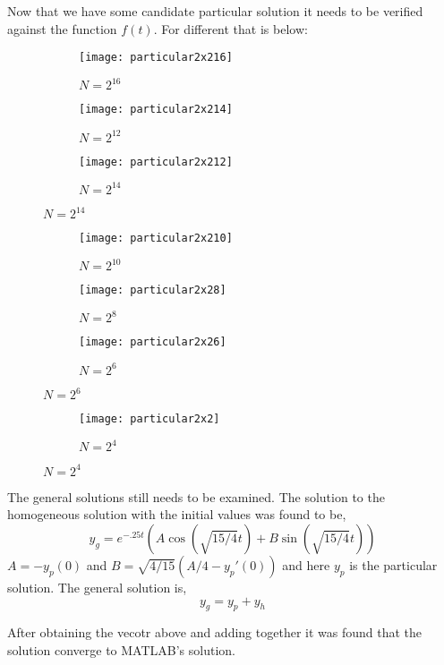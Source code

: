 \documentclass[]{article}
\begin{document}
\begin{flushleft}
Now that we have some candidate particular solution it needs to be verified against the function $ f(t) $. For different that is below:

\begin{figure}[H]
	\centering
	\begin{subfigure}[b]{0.3\textwidth}
		\texttt{[image: particular2x216]}
		\caption{$ N= 2^{16} $}
	\end{subfigure}
	\begin{subfigure}[b]{0.3\textwidth}
		\texttt{[image: particular2x214]}
		\caption{$ N= 2^{12} $}
	\end{subfigure}
	\begin{subfigure}[b]{0.3\textwidth}
		\texttt{[image: particular2x212]}
		\caption{$ N= 2^{14} $}
	\end{subfigure}
\end{figure}


\begin{figure}[H]
	\centering
		\begin{subfigure}[b]{0.3\textwidth}
			\texttt{[image: particular2x210]}
			\caption{$ N= 2^{10} $}
		\end{subfigure}
	\begin{subfigure}[b]{0.3\textwidth}
		\texttt{[image: particular2x28]}
		\caption{$ N= 2^{8} $}
	\end{subfigure}
	\begin{subfigure}[b]{0.3\textwidth}
		\texttt{[image: particular2x26]}
		\caption{$ N= 2^{6} $}
	\end{subfigure}
\end{figure}
\begin{figure}[H]
	\centering
	\begin{subfigure}[b]{0.3\textwidth}
		\texttt{[image: particular2x2]}
		\caption{$ N= 2^{4} $}
	\end{subfigure}
\end{figure}

The general solutions still needs to be examined. The solution to the homogeneous solution with the initial values was found to be, 
\[ y_g = e^{-.25t}(A \cos(\sqrt{15/4} t )  + B \sin(\sqrt{15/4} t) ) \]
$ A = -y_p(0) $ and $ B = \sqrt{4/15}(A/4 - y_p'(0)) $ and here $ y_p $ is the particular solution. The general solution is, 
\[  y_g = y_p + y_h\]

After obtaining the vecotr above and adding together it was found that the solution converge to MATLAB's  solution. 


\end{flushleft}
\end{document}
